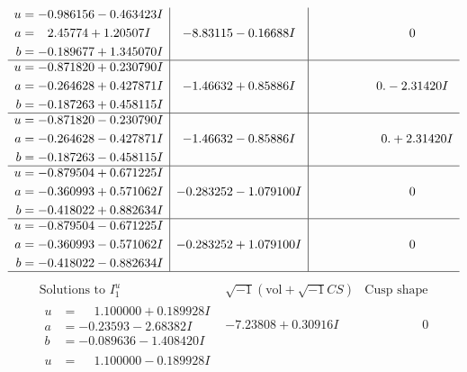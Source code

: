 \documentclass[1p]{elsarticle_modified}
\theoremstyle{definition}
\newcommand{\I}{\sqrt{-1}}
\begin{document}
$$\begin{array}{c|c|c}
\begin{aligned}
u &= -0.986156 - 0.463423 I \\
a &= \phantom{-}2.45774 + 1.20507 I \\
b &= -0.189677 + 1.345070 I\end{aligned}
 & -8.83115 - 0.16688 I & \phantom{-0.000000 } 0 \\ \hline\begin{aligned}
u &= -0.871820 + 0.230790 I \\
a &= -0.264628 + 0.427871 I \\
b &= -0.187263 + 0.458115 I\end{aligned}
 & -1.46632 + 0.85886 I & \phantom{-0.000000 } 0. - 2.31420 I \\ \hline\begin{aligned}
u &= -0.871820 - 0.230790 I \\
a &= -0.264628 - 0.427871 I \\
b &= -0.187263 - 0.458115 I\end{aligned}
 & -1.46632 - 0.85886 I & \phantom{-0.000000 -}0. + 2.31420 I \\ \hline\begin{aligned}
u &= -0.879504 + 0.671225 I \\
a &= -0.360993 + 0.571062 I \\
b &= -0.418022 + 0.882634 I\end{aligned}
 & -0.283252 - 1.079100 I & \phantom{-0.000000 } 0 \\ \hline\begin{aligned}
u &= -0.879504 - 0.671225 I \\
a &= -0.360993 - 0.571062 I \\
b &= -0.418022 - 0.882634 I\end{aligned}
 & -0.283252 + 1.079100 I & \phantom{-0.000000 } 0\\
 \hline 
 \end{array}$$\newpage$$\begin{array}{c|c|c}  
\text{Solutions to }I^u_{1}& \I (\text{vol} + \sqrt{-1}CS) & \text{Cusp shape}\\
 \hline 
\begin{aligned}
u &= \phantom{-}1.100000 + 0.189928 I \\
a &= -0.23593 - 2.68382 I \\
b &= -0.089636 - 1.408420 I\end{aligned}
 & -7.23808 + 0.30916 I & \phantom{-0.000000 } 0 \\ \hline\begin{aligned}
u &= \phantom{-}1.100000 - 0.189928 I \\

\end{aligned}
\end{array}$$
\end{document}
